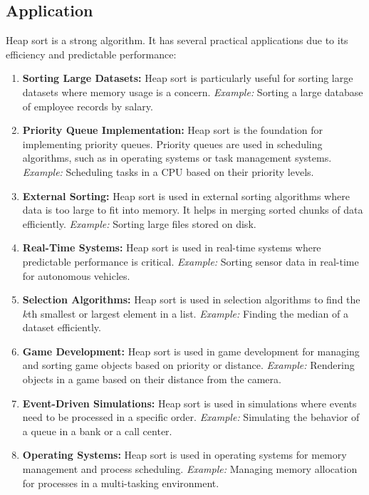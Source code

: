 \subsection{Application}

Heap sort is a strong algorithm. It has several practical applications due to its efficiency and predictable performance:
\begin{enumerate}
    \item \textbf{Sorting Large Datasets:} Heap sort is particularly useful for sorting large datasets where memory usage is a concern. \textit{Example:} Sorting a large database of employee records by salary.
    \item \textbf{Priority Queue Implementation:} Heap sort is the foundation for implementing priority queues. Priority queues are used in scheduling algorithms, such as in operating systems or task management systems. \textit{Example:} Scheduling tasks in a CPU based on their priority levels.
    \item \textbf{External Sorting:} Heap sort is used in external sorting algorithms where data is too large to fit into memory. It helps in merging sorted chunks of data efficiently. \textit{Example:} Sorting large files stored on disk.
    \item \textbf{Real-Time Systems:} Heap sort is used in real-time systems where predictable performance is critical. \textit{Example:} Sorting sensor data in real-time for autonomous vehicles.
    \item \textbf{Selection Algorithms:} Heap sort is used in selection algorithms to find the $k$th smallest or largest element in a list. \textit{Example:} Finding the median of a dataset efficiently.
    \item \textbf{Game Development:} Heap sort is used in game development for managing and sorting game objects based on priority or distance. \textit{Example:} Rendering objects in a game based on their distance from the camera.
    \item \textbf{Event-Driven Simulations:} Heap sort is used in simulations where events need to be processed in a specific order. \textit{Example:} Simulating the behavior of a queue in a bank or a call center.
    \item \textbf{Operating Systems:} Heap sort is used in operating systems for memory management and process scheduling. \textit{Example:} Managing memory allocation for processes in a multi-tasking environment.
\end{enumerate}

